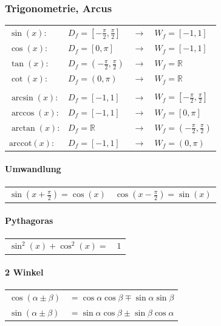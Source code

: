 		\subsubsection{Trigonometrie, Arcus}
			\begin{tabular}{llll}
				$\sin(x)$: & $D_f=[-\frac{\pi}{2},\frac{\pi}{2}]$ & $\rightarrow$ &  $W_f=[-1,1]$ \\
				$\cos(x)$: & $D_f=[0,\pi]$ & $\rightarrow$ &  $W_f=[-1,1]$  \\
				$\tan(x)$: & $D_f=(-\frac{\pi}{2},\frac{\pi}{2})$ & $\rightarrow$ & $W_f=\mathbb{R}$\\
				$\cot(x)$: & $D_f=(0,\pi)$ & $\rightarrow$ &  $W_f=\mathbb{R}$ \\
				\\
				$\arcsin(x)$: & $D_f=[-1,1] $ & $\rightarrow$ & $ W_f=[-\frac{\pi}{2},\frac{\pi}{2}]$ \\
				$\arccos(x)$: & $D_f=[-1,1]$ & $\rightarrow$ &  $W_f=[0,\pi]$ \\
				$\arctan(x)$: & $D_f=\mathbb{R}$ & $\rightarrow$ &  $W_f=(-\frac{\pi}{2},\frac{\pi}{2})$ \\
				$\mathrm{arccot}(x)$: & $D_f=[-1,1]$ & $\rightarrow$ &  $W_f=(0,\pi)$ \\		
			\end{tabular}

			\paragraph{Umwandlung}
				\begin{tabular}{ll}
					$\sin(x + \frac{\pi}{2}) = \cos(x)$ & $\cos(x - \frac{\pi}{2}) = \sin(x)$ \\	
				\end{tabular}

			\paragraph{Pythagoras}
				\begin{tabular}{ll}
					$\sin^2(x) + \cos^2(x) =$ & $ 1 $ \\
				\end{tabular}

			\paragraph{2 Winkel}
				\begin{tabular}{ll}
					$\cos(\alpha \pm \beta)$ & $= \cos\alpha\cos\beta \mp \sin\alpha\sin\beta$ \\
					$\sin(\alpha \pm \beta)$ & $= \sin\alpha\cos\beta \pm \sin\beta\cos\alpha$ \\
				\end{tabular}

